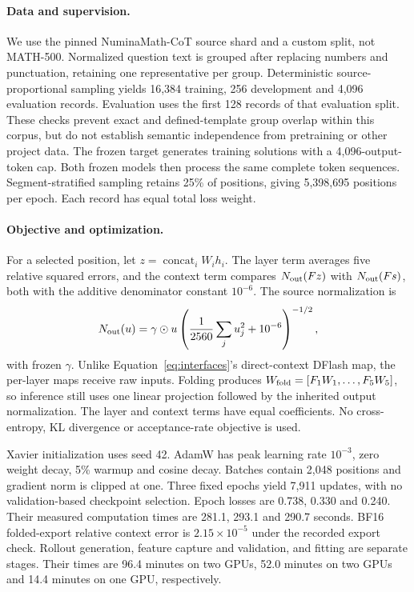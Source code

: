 \documentclass{article}
\begin{document}
\paragraph{Data and supervision.}
We use the pinned NuminaMath-CoT source shard and a custom split, not
MATH-500. Normalized question text is grouped after replacing numbers
and punctuation, retaining one representative per group. Deterministic
source-proportional sampling yields 16,384 training, 256 development
and 4,096 evaluation records. Evaluation uses the first 128 records of
that evaluation split. These checks prevent exact and defined-template
group overlap within this corpus, but do not establish semantic
independence from pretraining or other project data.
The frozen target generates training solutions with a 4,096-output-token
cap. Both frozen models then process the same complete token sequences.
Segment-stratified sampling retains 25\% of positions, giving 5,398,695
positions per epoch. Each record has equal total loss weight.

\paragraph{Objective and optimization.}
For a selected position, let $z=\operatorname{concat}_i W_i h_i$.
The layer term averages five relative squared errors, and the context
term compares $N_{\rm out}(Fz)$ with $N_{\rm out}(Fs)$, both with the
additive denominator constant $10^{-6}$. The source normalization is
\begin{equation}
N_{\rm out}(u)=\gamma\odot u
\left(\frac{1}{2560}\sum_j u_j^2+10^{-6}\right)^{-1/2},
\end{equation}
with frozen $\gamma$. Unlike Equation~\ref{eq:interfaces}'s direct-context
DFlash map, the per-layer maps receive raw inputs. Folding produces
$W_{\rm fold}=[F_1W_1,\ldots,F_5W_5]$, so inference still uses one
linear projection followed by the inherited output normalization.
The layer and context terms have equal coefficients. No cross-entropy,
KL divergence or acceptance-rate objective is used.

Xavier initialization uses seed 42. AdamW has peak learning rate $10^{-3}$,
zero weight decay, 5\% warmup and cosine decay. Batches contain 2,048
positions and gradient norm is clipped at one. Three fixed epochs yield
7,911 updates, with no validation-based checkpoint selection. Epoch
losses are 0.738, 0.330 and 0.240. Their measured computation times are
281.1, 293.1 and 290.7 seconds. BF16 folded-export relative context error
is $2.15\times10^{-5}$ under the recorded export check.
Rollout generation, feature capture and validation, and fitting are
separate stages. Their times are 96.4 minutes on two GPUs, 52.0 minutes
on two GPUs and 14.4 minutes on one GPU, respectively.
\end{document}
